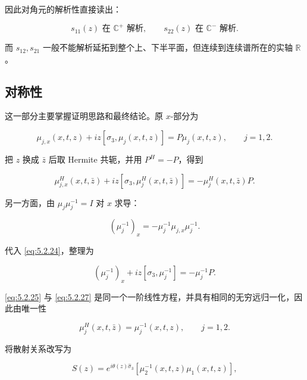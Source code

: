 \documentclass[
    lang=cn,
    scheme=chinese,
    mode=simple,
    device=normal,
    color=blue,
    math=cm,
    thmcnt=section,
    12pt,
    nowatermark
]{elegantbook}
\begin{document}
因此对角元的解析性直接读出：

\[
    s_{11}(z)\text{ 在 }\mathbb{C}^+\text{ 解析},
    \qquad
    s_{22}(z)\text{ 在 }\mathbb{C}^-\text{ 解析}.
\]

而 $s_{12},s_{21}$ 一般不能解析延拓到整个上、下半平面，但连续到连续谱所在的实轴 $\mathbb{R}$。

\subsection{对称性}

这一部分主要掌握证明思路和最终结论。原 $x$-部分为

\begin{equation}
    \mu_{j,x}(x,t,z)
    +
    iz[\sigma_3,\mu_j(x,t,z)]
    =
    P\mu_j(x,t,z),
    \qquad j=1,2.
    \tag{5.2.24}
    \label{eq:5.2.24}
\end{equation}

把 $z$ 换成 $\bar z$ 后取 Hermite 共轭，并用 $P^H=-P$，得到

\begin{equation}
    \mu_{j,x}^H(x,t,\bar z)
    +
    iz[\sigma_3,\mu_j^H(x,t,\bar z)]
    =
    -\mu_j^H(x,t,\bar z)P.
    \tag{5.2.25}
    \label{eq:5.2.25}
\end{equation}

另一方面，由 $\mu_j\mu_j^{-1}=I$ 对 $x$ 求导：

\begin{equation}
    (\mu_j^{-1})_x
    =
    -\mu_j^{-1}\mu_{j,x}\mu_j^{-1}.
    \tag{5.2.26}
    \label{eq:5.2.26}
\end{equation}

代入 \eqref{eq:5.2.24}，整理为

\begin{equation}
    (\mu_j^{-1})_x
    +
    iz[\sigma_3,\mu_j^{-1}]
    =
    -\mu_j^{-1}P.
    \tag{5.2.27}
    \label{eq:5.2.27}
\end{equation}

\eqref{eq:5.2.25} 与 \eqref{eq:5.2.27} 是同一个一阶线性方程，并具有相同的无穷远归一化，因此由唯一性

\begin{equation}
    \mu_j^H(x,t,\bar z)
    =
    \mu_j^{-1}(x,t,z),
    \qquad j=1,2.
    \tag{5.2.28}
    \label{eq:5.2.28}
\end{equation}

将散射关系改写为

\begin{equation}
    S(z)
    =
    e^{i\theta(z)\widehat{\sigma}_3}
    \left[\mu_2^{-1}(x,t,z)\mu_1(x,t,z)\right],
    \tag{5.2.29}
    \label{eq:5.2.29}
\end{equation}
\end{document}
